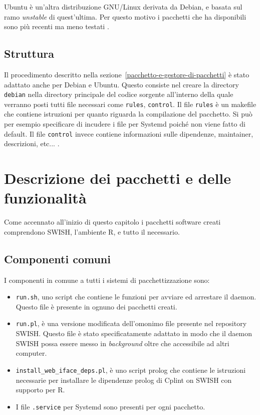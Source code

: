 \documentclass[10pt,titlepage,twoside,a4paper]{report}
\begin{document}
Ubuntu è un'altra distribuzione GNU/Linux derivata da Debian, e basata sul ramo 
\emph{unstable} di quest'ultima. Per questo motivo i pacchetti che ha 
disponibili sono più recenti ma meno testati \cite{ubuntu}.

\subsection{Struttura}
Il procedimento descritto nella sezione~\ref{pacchetto-e-gestore-di-pacchetti}
è stato adattato anche per Debian e Ubuntu. Questo consiste nel creare la 
directory \texttt{debian} nella directory principale del codice sorgente 
all'interno della quale verranno posti tutti file necessari come 
\texttt{rules}, \texttt{control}.  Il file \texttt{rules} è un makefile che 
contiene istruzioni per quanto riguarda la compilazione del pacchetto. Si può 
per esempio specificare di incudere i file per Systemd poiché non viene fatto 
di default. Il file \texttt{control} invece contiene informazioni sulle 
dipendenze, maintainer, descrizioni, etc... \cite{debianPackaging}.


\section{Descrizione dei pacchetti e delle funzionalità}
Come accennato all'inizio di questo capitolo i pacchetti software creati 
comprendono SWISH, l'ambiente R, e tutto il necessario.

\subsection{Componenti comuni}
I componenti in comune a tutti i sistemi di pacchettizzazione sono:
\begin{itemize}
    \item \texttt{run.sh}, uno script che contiene le funzioni per avviare ed  
          arrestare il daemon. Questo file è presente in ognuno dei pacchetti
          creati.

    \item \texttt{run.pl}, è una versione modificata dell'omonimo file presente
          nel repository SWISH. Questo file è stato specificatamente adattato
          in modo che il daemon SWISH possa essere messo in 
          \emph{background} oltre che accessibile ad altri computer.

    \item \texttt{install\_web\_iface\_deps.pl}, è uno script prolog che 
contiene le istruzioni necessarie per installare le dipendenze prolog di Cplint 
on SWISH con supporto per R.

    \item I file \texttt{.service} per Systemd sono presenti per ogni 
          pacchetto.
\end{itemize}
\end{document}
